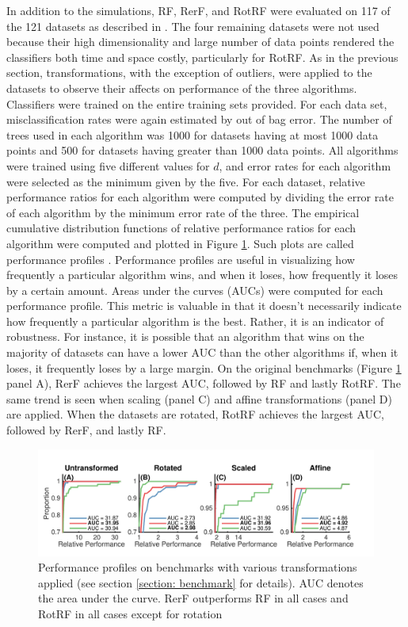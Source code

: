 \documentclass{article}
\begin{document}
In addition to the simulations, RF, RerF, and RotRF were evaluated on 117 of the 121 datasets as described in \cite{Delgado2014}. The four remaining datasets were not used because their high dimensionality and large number of data points rendered the classifiers both time and space costly, particularly for RotRF. As in the previous section, transformations, with the exception of outliers, were applied to the datasets to observe their affects on performance of the three algorithms. Classifiers were trained on the entire training sets provided. For each data set, misclassification rates were again estimated by out of bag error. The number of trees used in each algorithm was 1000 for datasets having at most 1000 data points and 500 for datasets having greater than 1000 data points. All algorithms were trained using five different values for $d$, and error rates for each algorithm were selected as the minimum given by the five. For each dataset, relative performance ratios for each algorithm were computed by dividing the error rate of each algorithm by the minimum error rate of the three. The empirical cumulative distribution functions of relative performance ratios for each algorithm were computed and plotted in Figure \ref{benchmark}. Such plots are called performance profiles \cite{Dolan2002}. Performance profiles are useful in visualizing how frequently a particular algorithm wins, and when it loses, how frequently it loses by a certain amount. Areas under the curves (AUCs) were computed for each performance profile. This metric is valuable in that it doesn't necessarily indicate how frequently a particular algorithm is the best. Rather, it is an indicator of robustness. For instance, it is possible that an algorithm that wins on the majority of datasets can have a lower AUC than the other algorithms if, when it loses, it frequently loses by a large margin. On the original benchmarks (Figure \ref{benchmark} panel A), RerF achieves the largest AUC, followed by RF and lastly RotRF. The same trend is seen when scaling (panel C) and affine transformations (panel D) are applied. When the datasets are rotated, RotRF achieves the largest AUC, followed by RerF, and lastly RF. 

\begin{figure}[ht]
\vskip 0.2in
\begin{center}
\centerline{\includegraphics[width=\columnwidth]{../Figures/pdf/Fig4_benchmark}}
\caption{Performance profiles on benchmarks with various transformations applied (see section \ref{section: benchmark} for details). AUC denotes the area under the curve. RerF outperforms RF in all cases and RotRF in all cases except for rotation}
\label{benchmark}
\end{center}
\vskip -0.2in
\end{figure}
\end{document}
